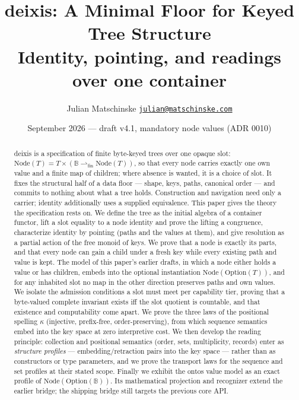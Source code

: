 \documentclass[11pt]{article}
\title{deixis: A Minimal Floor for Keyed Tree Structure\\
  \large Identity, pointing, and readings over one container}
\author{Julian Matschinske \quad
  \href{mailto:julian@matschinske.com}{\small\texttt{julian@matschinske.com}}}
\date{September 2026 — draft v4.1, mandatory node values (ADR 0010)}
\theoremstyle{definition}
\newcommand{\Bytes}{\mathbb{B}}                    %
\newcommand{\NodeT}[1]{\mathrm{Node}(#1)}
\begin{document}
\maketitle

\begin{abstract}
deixis is a specification of finite byte-keyed trees over one opaque slot:
$\NodeT{T} = T \times (\Bytes \rightharpoonup_{\mathrm{fin}} \NodeT{T})$, so that every
node carries exactly one own value and a finite map of children; where absence is wanted,
it is a choice of slot. It fixes
the structural half of a data floor --- shape, keys, paths, canonical order --- and
commits to nothing about what a tree holds. Construction and navigation need only a
carrier; identity additionally uses a supplied equivalence. This paper gives the theory the specification
rests on. We define the tree as the initial algebra of a container functor, lift a
slot equality to a node identity and prove the lifting a congruence, characterize
identity by pointing (paths and the values at them), and give resolution as a partial
action of the free monoid of keys. We prove that a node is exactly its parts, and that
every node can gain a child under a fresh key while every existing path and value is
kept. The model of this paper's earlier drafts, in which a node either holds a value or
has children, embeds into the optional instantiation $\NodeT{\mathrm{Option}(T)}$, and
for any inhabited slot no map in the other direction preserves paths and own values. We isolate the admission conditions a slot must meet per capability
tier, proving that a byte-valued complete invariant exists iff the slot quotient is
countable, and that existence and computability come apart. We prove the three laws of the positional
spelling $\kappa$ (injective, prefix-free, order-preserving), from which sequence
semantics embed into the key space at zero interpretive cost. We then develop the
reading principle: collection and positional semantics (order, sets, multiplicity,
records) enter as \emph{structure profiles} --- embedding/retraction pairs into the
key space --- rather than as constructors or type parameters, and we prove the
transport laws for the sequence and set profiles at their stated scope. Finally we
exhibit the ontos value model as an exact profile of
$\NodeT{\mathrm{Option}(\Bytes)}$. Its mathematical projection and recognizer extend
the earlier bridge; the shipping bridge still targets the previous core API.
\end{abstract}
\end{document}
